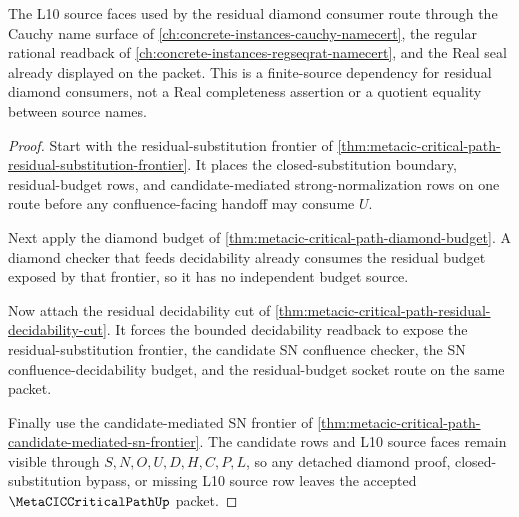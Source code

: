 The L10 source faces used by the residual diamond consumer route through the Cauchy name surface of \autoref{ch:concrete-instances-cauchy-namecert}, the regular rational readback of \autoref{ch:concrete-instances-regseqrat-namecert}, and the Real seal already displayed on the packet. This is a finite-source dependency for residual diamond consumers, not a Real completeness assertion or a quotient equality between source names.

\begin{proof}
Start with the residual-substitution frontier of \autoref{thm:metacic-critical-path-residual-substitution-frontier}. It places the closed-substitution boundary, residual-budget rows, and candidate-mediated strong-normalization rows on one route before any confluence-facing handoff may consume $U$.

Next apply the diamond budget of \autoref{thm:metacic-critical-path-diamond-budget}. A diamond checker that feeds decidability already consumes the residual budget exposed by that frontier, so it has no independent budget source.

Now attach the residual decidability cut of \autoref{thm:metacic-critical-path-residual-decidability-cut}. It forces the bounded decidability readback to expose the residual-substitution frontier, the candidate SN confluence checker, the SN confluence-decidability budget, and the residual-budget socket route on the same packet.

Finally use the candidate-mediated SN frontier of \autoref{thm:metacic-critical-path-candidate-mediated-sn-frontier}. The candidate rows and L10 source faces remain visible through $S,N,O,U,D,H,C,P,L$, so any detached diamond proof, closed-substitution bypass, or missing L10 source row leaves the accepted $\MetaCICCriticalPathUp$ packet.
\end{proof}

